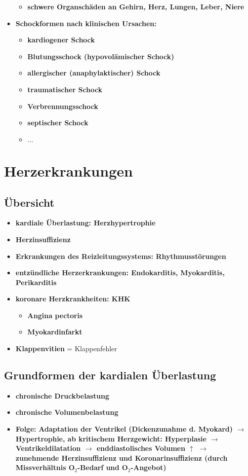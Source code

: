 \begin{itemize}
				\begin{itemize}
					\item \textbf{schwere Organschäden an Gehirn, Herz, Lungen, Leber, Niere}
				\end{itemize}
			\item \textbf{Schockformen nach klinischen Ursachen:}
				\begin{itemize}
					\item \textbf{kardiogener Schock}
					\item \textbf{Blutungsschock (hypovolämischer Schock)}
					\item \textbf{allergischer (anaphylaktischer) Schock}
					\item \textbf{traumatischer Schock}
					\item \textbf{Verbrennungsschock}
					\item \textbf{septischer Schock}
					\item \textbf{$\dots$}
				\end{itemize}
		\end{itemize}
		
\section{Herzerkrankungen}
	\subsection{Übersicht}
		\begin{itemize}
			\item \textbf{kardiale Überlastung: Herzhypertrophie}
			\item \textbf{Herzinsuffizienz}
			\item \textbf{Erkrankungen des Reizleitungssystems: Rhythmusstörungen}
			\item \textbf{entzündliche Herzerkrankungen: Endokarditis, Myokarditis, Perikarditis}
			\item \textbf{koronare Herzkrankheiten: KHK}
				\begin{itemize}
					\item \textbf{Angina pectoris}
					\item \textbf{Myokardinfarkt}
				\end{itemize}
			\item \textbf{Klappenvitien} = Klappenfehler
		\end{itemize}
	\subsection{Grundformen der kardialen Überlastung}
		\begin{itemize}
			\item \textbf{chronische Druckbelastung}
			\item \textbf{chronische Volumenbelastung}
			\item \textbf{Folge: Adaptation der Ventrikel (Dickenzunahme d. Myokard)  $\rightarrow$  Hypertrophie, ab kritischem Herzgewicht: Hyperplasie  $\rightarrow$ Ventrikeldilatation  $\rightarrow$  enddiastolisches Volumen $\uparrow$ $\rightarrow$  zunehmende Herzinsuffizienz und Koronarinsuffizienz (durch Missverhältnis O$_2$-Bedarf und  O$_2$-Angebot) }
		\end{itemize}
